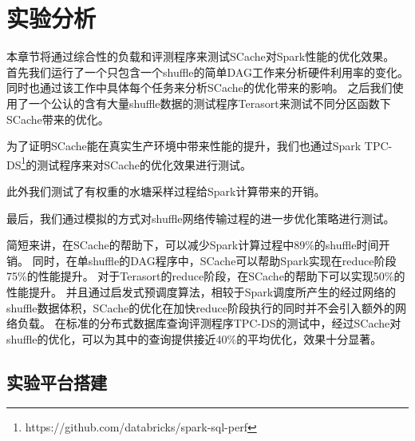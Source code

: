 
\chapter{实验分析}
\label{chap:evaluation}

本章节将通过综合性的负载和评测程序来测试SCache对Spark性能的优化效果。
首先我们运行了一个只包含一个shuffle的简单DAG工作来分析硬件利用率的变化。
同时也通过该工作中具体每个任务来分析SCache的优化带来的影响。
之后我们使用了一个公认的含有大量shuffle数据的测试程序Terasort\cite{terasort}来测试不同分区函数下SCache带来的优化。

为了证明SCache能在真实生产环境中带来性能的提升，我们也通过Spark TPC-DS\footnote{https://github.com/databricks/spark-sql-perf}的测试程序来对SCache的优化效果进行测试。

此外我们测试了有权重的水塘采样过程给Spark计算带来的开销。

最后，我们通过模拟的方式对shuffle网络传输过程的进一步优化策略进行测试。


简短来讲，在SCache的帮助下，可以减少Spark计算过程中89\%的shuffle时间开销。
同时，在单shuffle的DAG程序中，SCache可以帮助Spark实现在reduce阶段75\%的性能提升。
对于Terasort的reduce阶段，在SCache的帮助下可以实现50\%的性能提升。
并且通过启发式预调度算法，相较于Spark调度所产生的经过网络的shuffle数据体积，SCache的优化在加快reduce阶段执行的同时并不会引入额外的网络负载。
在标准的分布式数据库查询评测程序TPC-DS的测试中，经过SCache对shuffle的优化，可以为其中的查询提供接近40\%的平均优化，效果十分显著。

\section{实验平台搭建}

